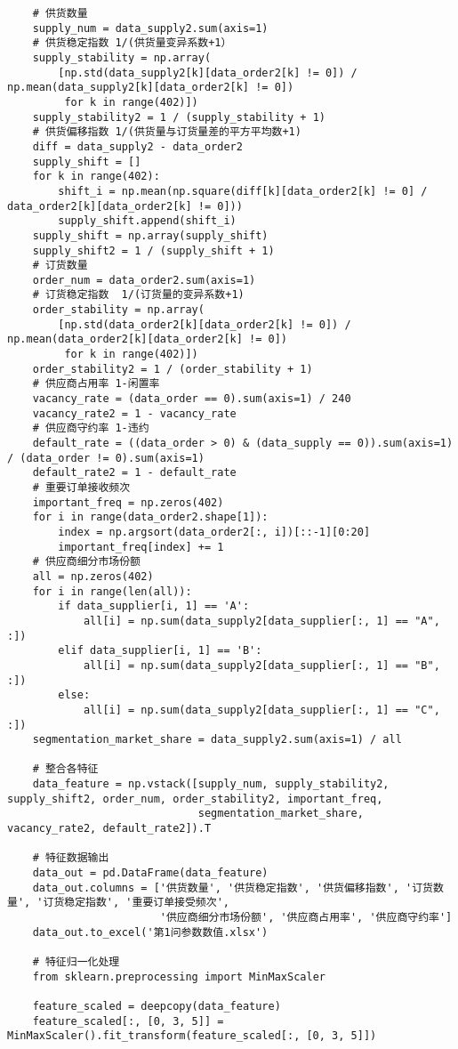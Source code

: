 \documentclass[UTF8]{ctexart}
\begin{document}
\begin{lstlisting}
	# 供货数量
	supply_num = data_supply2.sum(axis=1)
	# 供货稳定指数 1/(供货量变异系数+1）
	supply_stability = np.array(
		[np.std(data_supply2[k][data_order2[k] != 0]) / np.mean(data_supply2[k][data_order2[k] != 0])
		 for k in range(402)])
	supply_stability2 = 1 / (supply_stability + 1)
	# 供货偏移指数 1/(供货量与订货量差的平方平均数+1)
	diff = data_supply2 - data_order2
	supply_shift = []
	for k in range(402):
		shift_i = np.mean(np.square(diff[k][data_order2[k] != 0] / data_order2[k][data_order2[k] != 0]))
		supply_shift.append(shift_i)
	supply_shift = np.array(supply_shift)
	supply_shift2 = 1 / (supply_shift + 1)
	# 订货数量
	order_num = data_order2.sum(axis=1)
	# 订货稳定指数  1/(订货量的变异系数+1)
	order_stability = np.array(
		[np.std(data_order2[k][data_order2[k] != 0]) / np.mean(data_order2[k][data_order2[k] != 0])
		 for k in range(402)])
	order_stability2 = 1 / (order_stability + 1)
	# 供应商占用率 1-闲置率
	vacancy_rate = (data_order == 0).sum(axis=1) / 240
	vacancy_rate2 = 1 - vacancy_rate
	# 供应商守约率 1-违约
	default_rate = ((data_order > 0) & (data_supply == 0)).sum(axis=1) / (data_order != 0).sum(axis=1)
	default_rate2 = 1 - default_rate
	# 重要订单接收频次
	important_freq = np.zeros(402)
	for i in range(data_order2.shape[1]):
		index = np.argsort(data_order2[:, i])[::-1][0:20]
		important_freq[index] += 1
	# 供应商细分市场份额
	all = np.zeros(402)
	for i in range(len(all)):
		if data_supplier[i, 1] == 'A':
			all[i] = np.sum(data_supply2[data_supplier[:, 1] == "A", :])
		elif data_supplier[i, 1] == 'B':
			all[i] = np.sum(data_supply2[data_supplier[:, 1] == "B", :])
		else:
			all[i] = np.sum(data_supply2[data_supplier[:, 1] == "C", :])
	segmentation_market_share = data_supply2.sum(axis=1) / all
	
	# 整合各特征
	data_feature = np.vstack([supply_num, supply_stability2, supply_shift2, order_num, order_stability2, important_freq,
							  segmentation_market_share, vacancy_rate2, default_rate2]).T
	
	# 特征数据输出
	data_out = pd.DataFrame(data_feature)
	data_out.columns = ['供货数量', '供货稳定指数', '供货偏移指数', '订货数量', '订货稳定指数', '重要订单接受频次',
						'供应商细分市场份额', '供应商占用率', '供应商守约率']
	data_out.to_excel('第1问参数数值.xlsx')
	
	# 特征归一化处理
	from sklearn.preprocessing import MinMaxScaler
	
	feature_scaled = deepcopy(data_feature)
	feature_scaled[:, [0, 3, 5]] = MinMaxScaler().fit_transform(feature_scaled[:, [0, 3, 5]])
	

\end{lstlisting}
\end{document}
